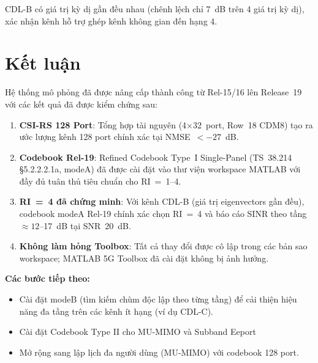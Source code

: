\documentclass[11pt,a4paper]{article}
\begin{document}
CDL-B có giá trị kỳ dị gần đều nhau (chênh lệch chỉ 7~dB trên 4 giá trị kỳ dị),
xác nhận kênh hỗ trợ ghép kênh không gian đến hạng 4.

\section{Kết luận}

Hệ thống mô phỏng đã được nâng cấp thành công từ Rel-15/16 lên
Release~19 với các kết quả đã được kiểm chứng sau:

\begin{enumerate}
  \item \textbf{CSI-RS 128 Port}: Tổng hợp tài nguyên (4$\times$32~port,
        Row~18 CDM8) tạo ra ước lượng kênh 128 port chính xác tại
        NMSE~$< -27$~dB.

  \item \textbf{Codebook Rel-19}: Refined Codebook Type~I Single-Panel
        (TS~38.214 \S5.2.2.2.1a, modeA) đã được cài đặt vào thư viện workspace
        MATLAB với đầy đủ tuân thủ tiêu chuẩn cho RI~=~1--4.

  \item \textbf{RI~=~4 đã chứng minh}: Với kênh CDL-B (giá trị eigenvectors gần đều),
        codebook modeA Rel-19 chính xác chọn RI~=~4 và báo cáo
        SINR theo tầng $\approx 12$--17~dB tại SNR~20~dB.

  \item \textbf{Không làm hỏng Toolbox}: Tất cả thay đổi được cô lập trong
        các bản sao workspace; MATLAB 5G Toolbox đã cài đặt không bị ảnh hưởng.
\end{enumerate}

\noindent\textbf{Các bước tiếp theo:}
\begin{itemize}
  \item Cài đặt modeB (tìm kiếm chùm độc lập theo từng tầng) để cải thiện
        hiệu năng đa tầng trên các kênh ít hạng (ví dụ CDL-C).
  \item Cài đặt Codebook Type II cho MU-MIMO và Subband Eeport
  \item Mở rộng sang lập lịch đa người dùng (MU-MIMO) với codebook 128 port.
\end{itemize}
\end{document}
